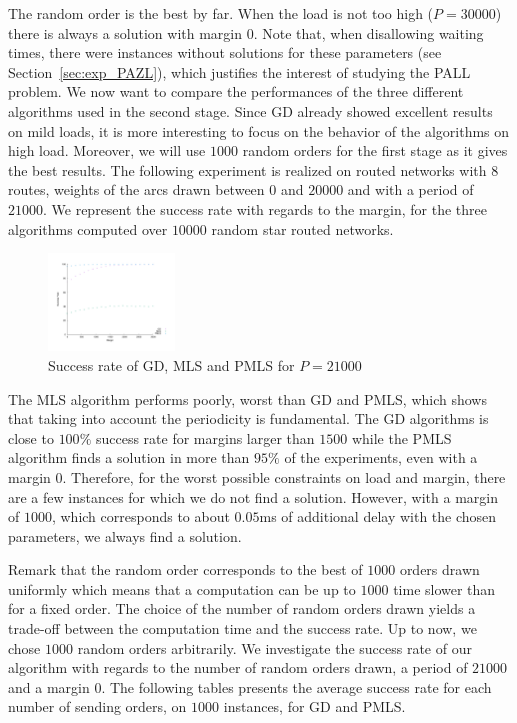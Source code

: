 \documentclass[10pt, conference, letterpaper]{IEEEtran}
\begin{document}
     The random order is the best by far. When the load is not too high ($P = 30000$) there is always a solution with margin $0$.
     Note that, when disallowing waiting times, there were instances without solutions for these parameters (see Section~\ref{sec:exp_PAZL}), which justifies the interest of studying the PALL problem. We now want to compare the performances of the three different algorithms used in the second stage. Since GD already showed excellent results on mild loads, it is more interesting to focus on the behavior of the algorithms on high load. Moreover, we will use $1000$ random orders for the first stage as it gives the best results. The following experiment is realized on routed networks with $8$ routes, weights of the arcs drawn between $0$ and $20000$ and with a period of $21000$.  We represent the success rate with regards to the margin, for the three algorithms computed over $10000$ random star routed networks. 
   

 
    \begin{figure} [H] 
       \begin{center}
      \includegraphics[width=0.3\textwidth]{retour_21000.pdf}
      \end{center}
            \vspace{-1cm}
      \caption{Success rate of GD, MLS and PMLS for $P = 21000$}
     \label{fig:success21000}
     \end{figure}
     
     The MLS algorithm performs poorly, worst than GD and PMLS, which shows that taking into account the periodicity is fundamental.
     The GD algorithms is close to $100\%$ success rate for margins larger than $1500$ while the PMLS algorithm finds a solution in more than $95\%$ of the experiments, even with a margin $0$. Therefore, for the worst possible constraints on load and margin, there are a few instances for which we do not find a solution. However, with a margin of $1000$, which corresponds to about $0.05$ms of additional delay with the chosen parameters, we always find a solution. 
     
    Remark that the random order corresponds to the best of $1000$ orders drawn uniformly which means that a computation can be up to $1000$ time slower than for a fixed order. The choice of the number of random orders drawn yields a trade-off between the computation time and the success rate. Up to now, we chose $1000$ random orders arbitrarily. We investigate the success rate of our algorithm with regards to the number of random orders drawn, a period of $21000$ and a margin $0$. The following tables presents the average success rate for each number of sending orders, on $1000$ instances, for GD and PMLS.
\end{document}

